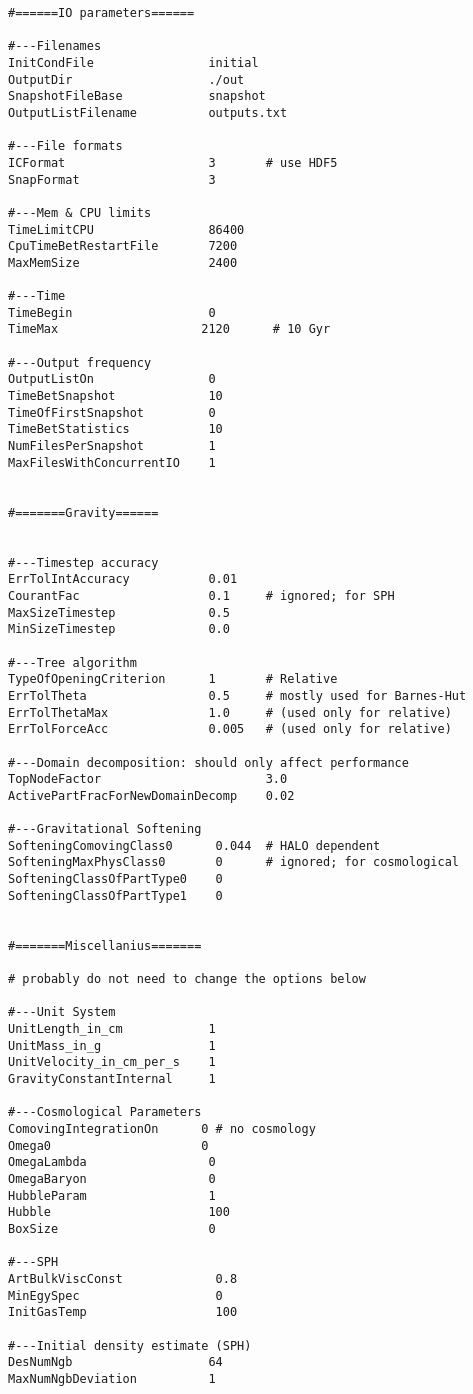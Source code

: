 \begin{verbatim}
#======IO parameters======

#---Filenames
InitCondFile                initial
OutputDir                   ./out
SnapshotFileBase            snapshot
OutputListFilename          outputs.txt

#---File formats 
ICFormat                    3       # use HDF5
SnapFormat                  3 

#---Mem & CPU limits
TimeLimitCPU                86400
CpuTimeBetRestartFile       7200
MaxMemSize                  2400

#---Time
TimeBegin                   0
TimeMax                    2120      # 10 Gyr

#---Output frequency
OutputListOn                0
TimeBetSnapshot             10
TimeOfFirstSnapshot         0 
TimeBetStatistics           10
NumFilesPerSnapshot         1
MaxFilesWithConcurrentIO    1 


#=======Gravity======


#---Timestep accuracy
ErrTolIntAccuracy           0.01
CourantFac                  0.1     # ignored; for SPH
MaxSizeTimestep             0.5
MinSizeTimestep             0.0 

#---Tree algorithm
TypeOfOpeningCriterion      1       # Relative
ErrTolTheta                 0.5     # mostly used for Barnes-Hut
ErrTolThetaMax              1.0     # (used only for relative)
ErrTolForceAcc              0.005   # (used only for relative)

#---Domain decomposition: should only affect performance
TopNodeFactor                       3.0
ActivePartFracForNewDomainDecomp    0.02

#---Gravitational Softening
SofteningComovingClass0      0.044  # HALO dependent
SofteningMaxPhysClass0       0      # ignored; for cosmological
SofteningClassOfPartType0    0
SofteningClassOfPartType1    0


#=======Miscellanius=======

# probably do not need to change the options below 

#---Unit System
UnitLength_in_cm            1 
UnitMass_in_g               1
UnitVelocity_in_cm_per_s    1 
GravityConstantInternal     1

#---Cosmological Parameters 
ComovingIntegrationOn      0 # no cosmology
Omega0                     0
OmegaLambda                 0 
OmegaBaryon                 0
HubbleParam                 1
Hubble                      100
BoxSize                     0

#---SPH
ArtBulkViscConst             0.8
MinEgySpec                   0
InitGasTemp                  100

#---Initial density estimate (SPH)
DesNumNgb                   64
MaxNumNgbDeviation          1
\end{verbatim}
